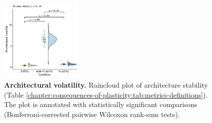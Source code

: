 \begin{figure}[ht!]
    \centering
    \includegraphics[width=0.35\textwidth]{chapters/03-evolutionary-consequences-of-plasticity/media/architectural-volatility.pdf}
    \caption{\small
        \textbf{Architectural volatility.}
        Raincloud plot of architecture stability (Table \ref{chapter:consequences-of-plasticity:tab:metrics-definitions}).
        The plot is annotated with statistically significant comparisons (Bonferroni-corrected pairwise Wilcoxon rank-sum tests). 
    }
    \label{chapter:consequences-of-plasticity:fig:architecture-volatility}
\end{figure}